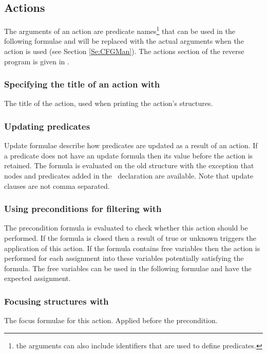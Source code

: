 \subsection{Actions}

The arguments of an action are predicate names\footnote{the
arguments can also include identifiers that are used to define
predicates.}  that can be used in the following formulae and will
be replaced with the actual arguments when the action is used (see
Section \ref{Se:CFGMan}). The actions section of the reverse
program is given in .

\subsubsection{Specifying the title of an action with \tvtitle}
The title of the action, used when printing the action's
structures.

\subsubsection{Updating predicates}

Update formulae describe how predicates are updated as a result of
an action. If a predicate does not have an update formula then its
value before the action is retained. The formula is evaluated on
the old structure with the exception that nodes and predicates
added in the \new\ declaration are available. Note that update
clauses are not comma separated.

\subsubsection{Using preconditions for filtering with \precond} The
precondition formula is evaluated to check whether this action
should be performed.  If the formula is closed then a result of
true or unknown triggers the application of this action.  If the
formula contains free variables then the action is performed for
each assignment into these variables potentially satisfying the
formula.  The free variables can be used in the following formulae
and have the expected assignment.

\subsubsection{Focusing structures with \focus} The focus
formulae for this action. Applied before the precondition.

